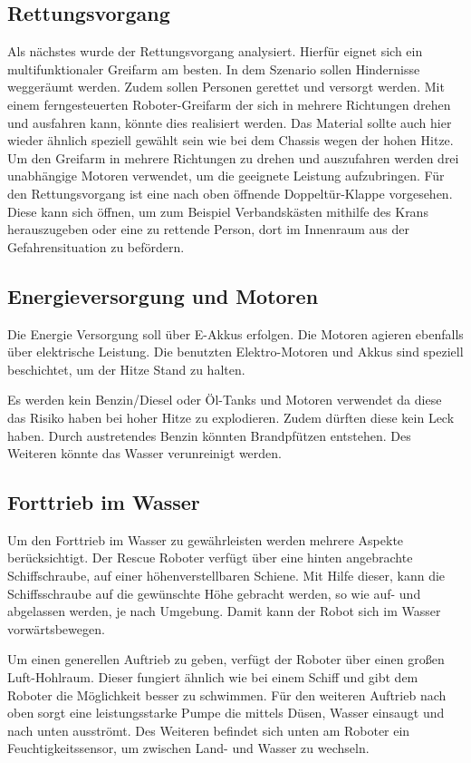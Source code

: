 \subsection {Rettungsvorgang}
Als nächstes wurde der Rettungsvorgang analysiert. 
Hierfür eignet sich ein multifunktionaler Greifarm am besten.
In dem Szenario sollen Hindernisse weggeräumt werden. 
Zudem sollen Personen gerettet und versorgt werden. 
Mit einem ferngesteuerten Roboter-Greifarm der sich in mehrere Richtungen drehen und ausfahren kann, könnte dies realisiert werden. 
Das Material sollte auch hier wieder ähnlich speziell gewählt sein wie bei dem Chassis wegen der hohen Hitze. 
Um den Greifarm in mehrere Richtungen zu drehen und auszufahren werden drei unabhängige Motoren verwendet, um die geeignete Leistung aufzubringen.
Für den Rettungsvorgang ist eine nach oben öffnende Doppeltür-Klappe vorgesehen. 
Diese kann sich öffnen, um zum Beispiel Verbandskästen mithilfe des Krans herauszugeben oder eine zu rettende Person, dort im Innenraum aus der Gefahrensituation zu befördern.

\subsection{Energieversorgung und Motoren}
Die Energie Versorgung soll über E-Akkus erfolgen. 
Die Motoren agieren ebenfalls über elektrische Leistung. 
Die benutzten Elektro-Motoren und Akkus sind speziell beschichtet, um der Hitze Stand zu halten. 

Es werden kein Benzin/Diesel oder Öl-Tanks und Motoren verwendet da diese das Risiko haben bei hoher Hitze zu explodieren. 
Zudem dürften diese kein Leck haben. 
Durch austretendes Benzin könnten Brandpfützen entstehen. 
Des Weiteren könnte das Wasser verunreinigt werden.

\subsection{Forttrieb im Wasser}
Um den Forttrieb im Wasser zu gewährleisten werden mehrere Aspekte berücksichtigt. 
Der Rescue Roboter verfügt über eine hinten angebrachte Schiffschraube, auf einer höhenverstellbaren Schiene.
Mit Hilfe dieser, kann die Schiffsschraube auf die gewünschte Höhe gebracht werden, so wie auf- und abgelassen werden, je nach Umgebung.
Damit kann der Robot sich im Wasser vorwärtsbewegen. 

Um einen generellen Auftrieb zu geben, verfügt der Roboter über einen großen Luft-Hohlraum. Dieser fungiert ähnlich wie bei einem Schiff und gibt dem Roboter die Möglichkeit besser zu schwimmen. Für den weiteren Auftrieb nach oben sorgt eine leistungsstarke Pumpe die mittels Düsen, Wasser einsaugt und nach unten ausströmt. Des Weiteren befindet sich unten am Roboter ein Feuchtigkeitssensor, um zwischen Land- und Wasser zu wechseln. 


